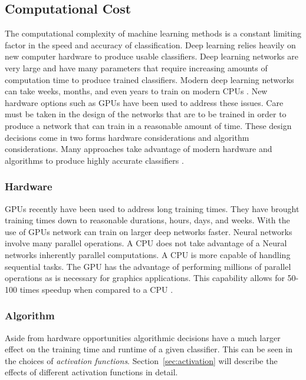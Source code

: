 \documentclass[font=12pt]{article}
\begin{document}
\subsection{Computational Cost}
The computational complexity of machine learning methods is a constant limiting factor in the speed and accuracy of classification. Deep learning relies heavily on new computer hardware to produce usable classifiers. Deep learning networks are very large and have many parameters that require increasing amounts of computation time to produce trained classifiers. Modern deep learning networks can take weeks, months, and even years to train on modern CPUs \cite{6248110}. New hardware options such as GPUs have been used to address these issues. Care must be taken in the design of the networks that are to be trained in order to produce a network that can train in a reasonable amount of time. These design decisions come in two forms hardware considerations and algorithm considerations. Many approaches take advantage of modern hardware and algorithms to produce highly accurate classifiers \cite{6248110,krizhevsky2012imagenet,sanchez2011high,long2015fully}.

\subsubsection{Hardware}
GPUs recently have been used to address long training times. They have brought training times down to reasonable durations, hours, days, and weeks. With the use of GPUs network can train on larger deep networks faster. Neural networks involve many parallel operations. A CPU does not take advantage of a Neural networks inherently parallel computations. A CPU is more capable of handling sequential tasks. The GPU has the advantage of performing millions of parallel operations as is necessary for graphics applications. This capability allows for 50-100 times speedup when compared to a CPU \cite{6248110}. 

\subsubsection{Algorithm}
Aside from hardware opportunities algorithmic decisions have a much larger effect on the training time and runtime of a given classifier. This can be seen in the choices of \emph{activation functions}. Section~\ref{sec:activation} will describe the effects of different activation functions in detail.
\end{document}
